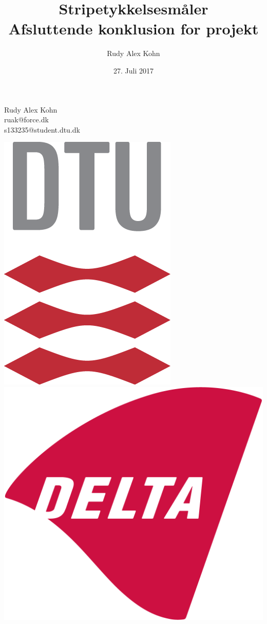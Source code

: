 \documentclass[11pt,a4paper,danish]{article}
\title{Stripetykkelsesmåler\\Afsluttende konklusion for projekt}
\author{Rudy Alex Kohn}
\date{27. Juli 2017}
\begin{document}
\maketitle
\renewcommand{\contentsname}{Indeks}
\renewcommand{\listfigurename}{Figurliste}
\renewcommand{\figurename}{Figur}
\renewcommand\refname{Referencer}

\begin{center}
Rudy Alex Kohn\\
ruak@force.dk\\
s133235@student.dtu.dk
\end{center}

\vspace{25mm}

\begin{center}
\includegraphics[scale=0.3]{Billeder/kunlogo.png}
\includegraphics[scale=0.15]{Billeder/DELTA_1024px.png}
\end{center}
\end{document}
